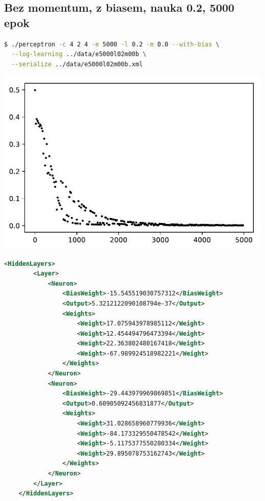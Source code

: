 \documentclass{classrep}
\begin{document}
\subsection{Bez momentum, z biasem, nauka 0.2, 5000 epok}
\begin{lstlisting}[language=bash]
$ ./perceptron -c 4 2 4 -e 5000 -l 0.2 -m 0.0 --with-bias \
  --log-learning ../data/e5000l02m00b \
  --serialize ../data/e5000l02m00b.xml
\end{lstlisting}
\begin{center}
 \includegraphics{sprawozdanie/output_0_15.pdf}
\end{center}
\begin{lstlisting}[language=xml]
    <HiddenLayers>
        <Layer>
            <Neuron>
                <BiasWeight>-15.545519030757312</BiasWeight>
                <Output>5.3212122090108794e-37</Output>
                <Weights>
                    <Weight>17.075943978985112</Weight>
                    <Weight>12.454494796473394</Weight>
                    <Weight>22.363802480167418</Weight>
                    <Weight>-67.989924518982221</Weight>
                </Weights>
            </Neuron>
            <Neuron>
                <BiasWeight>-29.443979969869851</BiasWeight>
                <Output>0.60905092456831877</Output>
                <Weights>
                    <Weight>31.028658960779936</Weight>
                    <Weight>-84.173329550478542</Weight>
                    <Weight>-5.1175377550280334</Weight>
                    <Weight>29.895078753162743</Weight>
                </Weights>
            </Neuron>
        </Layer>
    </HiddenLayers>
\end{lstlisting}
\clearpage
\end{document}
